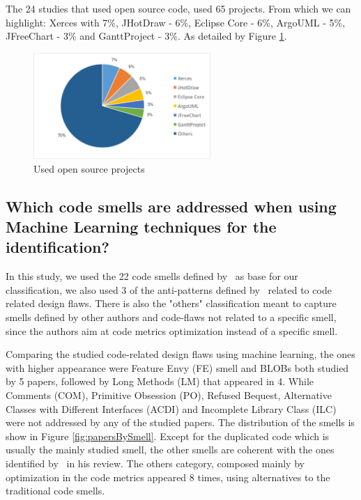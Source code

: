 The 24 studies that used open source code, used 65 projects. From which we can highlight: Xerces with 7\%, JHotDraw - 6\%, Eclipse Core - 6\%, ArgoUML - 5\%, JFreeChart - 3\% and GanttProject - 3\%. As detailed by Figure \ref{fig:StudiesByDataSource}.

\begin{figure}[hbt] 
    \centering
	\caption{Used open source projects}
	\label{fig:StudiesByDataSource}
	\includegraphics[width=0.6\textwidth]{imagens/StudiesByDataSource.png}
\end{figure}

\subsection{Which code smells are addressed when using Machine Learning techniques for the identification?}

In this study, we used the 22 code smells defined by~\cite{fowler1999refactoring} as base for our classification, we also used 3 of the anti-patterns defined by~\citep{brown1998antipatterns} related to code related design flaws. There is also the "others" classification meant to capture smells defined by other authors and code-flaws not related to a specific smell, since the authors aim at code metrics optimization instead of a specific smell.

Comparing the studied code-related design flaws using machine learning, the ones with higher appearance were Feature Envy (FE) smell and BLOBs both  studied by 5 papers, followed by Long Methods (LM) that appeared in 4. While Comments (COM), Primitive Obsession (PO), Refused Bequest, Alternative Classes with Different Interfaces (ACDI) and Incomplete Library Class (ILC) were not addressed by any of the studied papers. The distribution of the smells is show in Figure \ref{fig:papersBySmell}. Except for the duplicated code which is usually the mainly studied smell, the other smells are coherent with the ones identified by~\cite{zhang2011code} in his review. The others category, composed mainly by optimization in the code metrics appeared 8 times, using alternatives to the traditional code smells.

